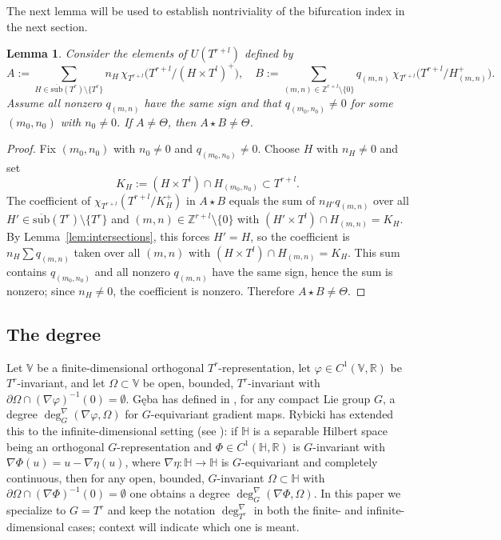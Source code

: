 \documentclass[reqno,twoside,12pt]{amsart}
\newtheorem{Lemma}[Remark]{Lemma}
\newcommand{\bH}{\mathbb{H}}
\newcommand{\bV}{\mathbb{V}}
\numberwithin{equation}{section} \errorcontextlines=0
\newcommand{\sub}{\overline{\mathrm{sub}}}
\begin{document}
The next lemma will be used to establish nontriviality of the bifurcation index in the next section.

\begin{Lemma}\label{lem:inters}
Consider the elements of $U(T^{r+l})$ defined by
\[
A:=\sum_{H\in\sub(T^{r})\setminus\{T^{r}\}} n_{H}\,\chi_{T^{r+l}}\bigl(T^{r+l}/(H\times T^{l})^{+}\bigr),\quad
B:=\sum_{(m,n)\in\mathbb{Z}^{r+l}\setminus\{0\}} q_{(m,n)}\,\chi_{T^{r+l}}\bigl(T^{r+l}/H_{(m,n)}^{+}\bigr).
\]
Assume all nonzero $q_{(m,n)}$ have the same sign and that $q_{(m_0,n_0)}\ne 0$ for some $(m_{0},n_{0})$ with $n_{0}\ne 0$. If $A\neq\Theta$, then $A\star B\ne \Theta$.
\end{Lemma}

\begin{proof}
Fix $(m_0,n_0)$ with $n_0\ne 0$ and $q_{(m_0,n_0)}\ne 0$. Choose $H$ with $n_H\ne 0$ and set $$K_H:=(H\times T^l)\cap H_{(m_0,n_0)}\subset T^{r+l}.$$ The coefficient of $\chi_{T^{r+l}}(T^{r+l}/K_H^+)$ in $A\star B$ equals the sum of $n_{H'}q_{(m,n)}$ over all $H'\in\sub(T^r)\setminus\{T^r\}$ and $(m,n)\in\mathbb{Z}^{r+l}\setminus\{0\}$ with $(H'\times T^l)\cap H_{(m,n)}=K_H$. By Lemma~\ref{lem:intersections}, this forces  $H'=H$, so the coefficient is $n_H\sum q_{(m,n)}$ taken over all $(m,n)$ with $(H\times T^l)\cap H_{(m,n)}=K_H$. This sum contains $q_{(m_0,n_0)}$ and all nonzero $q_{(m,n)}$ have the same sign, hence the sum is nonzero; since $n_H\ne 0$, the coefficient is nonzero. Therefore $A\star B\ne \Theta$.
\end{proof}


\subsection{The degree}\label{subsec:degree}

Let $\bV$ be a finite-dimensional orthogonal $T^r$-representation, let $\varphi\in C^{1}(\bV,\mathbb{R})$ be $T^r$-invariant, and let $\Omega\subset\bV$ be open, bounded, $T^r$-invariant with $\partial\Omega\cap(\nabla\varphi)^{-1}(0)=\emptyset$. Gęba has defined in \cite{Geba}, for any compact Lie group $G$, a degree $\deg^{\nabla}_{G}(\nabla\varphi,\Omega)$ for $G$-equivariant gradient maps. Rybicki has extended this to the infinite-dimensional setting (see \cite{Ryb2005milano}): if $\bH$ is a separable Hilbert space being an orthogonal $G$-representation and $\Phi\in C^{1}(\bH,\mathbb{R})$ is $G$-invariant with $\nabla\Phi(u)=u-\nabla\eta(u)$, where $\nabla\eta\colon\bH\to\bH$ is $G$-equivariant and completely continuous, then for any open, bounded, $G$-invariant $\Omega\subset\bH$ with $\partial\Omega\cap(\nabla\Phi)^{-1}(0)=\emptyset$ one obtains a degree $\deg^{\nabla}_{G}(\nabla\Phi,\Omega)$. In this paper we specialize to $G=T^r$ and keep the notation $\deg^{\nabla}_{T^r}$ in both the finite- and infinite-dimensional cases; context will indicate which one is meant.
\end{document}
